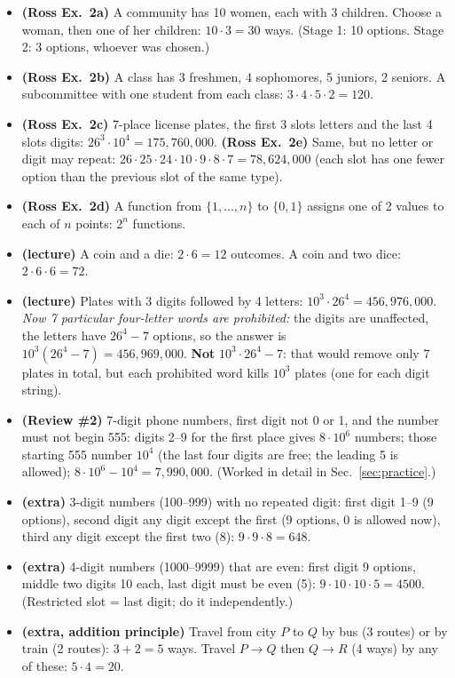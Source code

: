 \documentclass[11pt]{article}
\begin{document}
\begin{exbox}[Examples]
\begin{itemize}
\item \textbf{(Ross Ex.\ 2a)} A community has 10 women, each with 3 children. Choose a woman, then one of her children: $10\cdot3=30$ ways. (Stage 1: 10 options. Stage 2: 3 options, whoever was chosen.)
\item \textbf{(Ross Ex.\ 2b)} A class has 3 freshmen, 4 sophomores, 5 juniors, 2 seniors. A subcommittee with one student from each class: $3\cdot4\cdot5\cdot2=120$.
\item \textbf{(Ross Ex.\ 2c)} 7-place license plates, the first 3 slots letters and the last 4 slots digits: $26^3\cdot10^4=175{,}760{,}000$. \textbf{(Ross Ex.\ 2e)} Same, but no letter or digit may repeat: $26\cdot25\cdot24\cdot10\cdot9\cdot8\cdot7=78{,}624{,}000$ (each slot has one fewer option than the previous slot of the same type).
\item \textbf{(Ross Ex.\ 2d)} A function from $\{1,\dots,n\}$ to $\{0,1\}$ assigns one of 2 values to each of $n$ points: $2^n$ functions.
\item \textbf{(lecture)} A coin and a die: $2\cdot6=12$ outcomes. A coin and two dice: $2\cdot6\cdot6=72$.
\item \textbf{(lecture)} Plates with 3 digits followed by 4 letters: $10^3\cdot26^4=456{,}976{,}000$. \emph{Now 7 particular four-letter words are prohibited:} the digits are unaffected, the letters have $26^4-7$ options, so the answer is $10^3(26^4-7)=456{,}969{,}000$. \textbf{Not} $10^3\cdot26^4-7$: that would remove only 7 plates in total, but each prohibited word kills $10^3$ plates (one for each digit string).
\item \textbf{(Review \#2)} 7-digit phone numbers, first digit not 0 or 1, and the number must not begin 555: digits 2--9 for the first place gives $8\cdot10^6$ numbers; those starting 555 number $10^4$ (the last four digits are free; the leading 5 is allowed); $8\cdot10^6-10^4=7{,}990{,}000$. (Worked in detail in Sec.~\ref{sec:practice}.)
\item \textbf{(extra)} 3-digit numbers (100--999) with no repeated digit: first digit 1--9 (9 options), second digit any digit except the first (9 options, 0 is allowed now), third any digit except the first two (8): $9\cdot9\cdot8=648$.
\item \textbf{(extra)} 4-digit numbers (1000--9999) that are even: first digit 9 options, middle two digits 10 each, last digit must be even (5): $9\cdot10\cdot10\cdot5=4500$. (Restricted slot = last digit; do it independently.)
\item \textbf{(extra, addition principle)} Travel from city $P$ to $Q$ by bus (3 routes) or by train (2 routes): $3+2=5$ ways. Travel $P\to Q$ then $Q\to R$ (4 ways) by any of these: $5\cdot4=20$.
\end{itemize}
\end{exbox}
\end{document}
